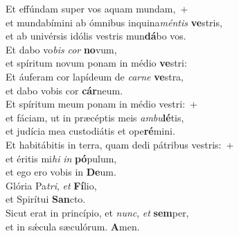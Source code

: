 \evenverse Et effúndam super vos aquam mundam,~+\\\evenverse  et mundabímini ab ómnibus inquina\textit{mén}\textit{tis} \textbf{ve}stris,~\*\\
\evenverse et ab univérsis idólis vestris mun\textbf{dá}bo vos.\\
\oddverse Et dabo vo\textit{bis} \textit{cor} \textbf{no}vum,~\*\\
\oddverse et spíritum novum ponam in médio \textbf{ve}stri:\\
\evenverse Et áuferam cor lapídeum de \textit{car}\textit{ne} \textbf{ve}stra,~\*\\
\evenverse et dabo vobis cor \textbf{cár}neum.\\
\oddverse Et spíritum meum ponam in médio vestri:~+\\
\oddverse  et fáciam, ut in præcéptis meis \textit{am}\textit{bu}\textbf{lé}tis,~\*\\
\oddverse et judícia mea custodiátis et ope\textbf{ré}mini.\\
\evenverse Et habitábitis in terra, quam dedi pátribus vestris:~+\\
\evenverse  et éritis mi\textit{hi} \textit{in} \textbf{pó}pulum,~\*\\
\evenverse et ego ero vobis in \textbf{De}um.\\
\oddverse Glória Pa\textit{tri}, \textit{et} \textbf{Fí}lio,~\*\\
\oddverse et Spirítui \textbf{San}cto.\\
\evenverse Sicut erat in princípio, et \textit{nunc}, \textit{et} \textbf{sem}per,~\*\\
\evenverse et in sǽcula sæculórum. \textbf{A}men.\\
